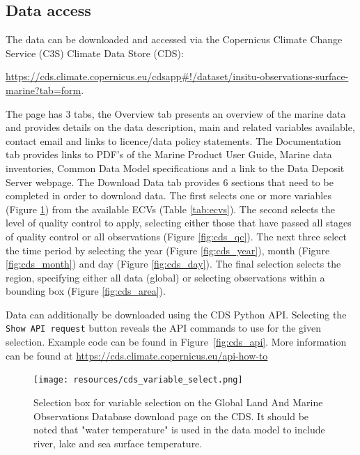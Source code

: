 \subsection{Data access}
The data can be downloaded and accessed via the Copernicus Climate Change Service (C3S) Climate Data Store (CDS):
\begin{center}
\sloppy\url{https://cds.climate.copernicus.eu/cdsapp#!/dataset/insitu-observations-surface-marine?tab=form}.
 \end{center}
The page has 3 tabs, the Overview tab presents an overview of the marine data and provides details on the data description, main and related variables available, contact email and links to licence/data policy statements. 
The Documentation tab provides links to PDF’s of the Marine Product User Guide, Marine data inventories, Common Data Model specifications and a link to the Data Deposit Server webpage. The Download Data tab provides 6 sections that need to be completed in order to download data. The first selects one or more variables (Figure \ref{fig:cds_variable}) from the available ECVs (Table \ref{tab:ecvs}). The second selects the level of quality control to apply, selecting either those that have passed all stages of quality control or all observations (Figure \ref{fig:cds_qc}). The next three select the time period  by selecting the year (Figure \ref{fig:cds_year}), month (Figure \ref{fig:cds_month}) and day (Figure \ref{fig:cds_day}). The final selection selects the region, specifying either all data (global) or selecting observations within a bounding box (Figure \ref{fig:cds_area}).

Data can additionally be downloaded using the CDS Python API. Selecting the \texttt{Show API request} button reveals the API commands to use for the given selection. Example code can be found in Figure~\ref{fig:cds_api}.
More information can be found at \url{https://cds.climate.copernicus.eu/api-how-to}

\FloatBarrier
\begin{figure}[h]
\centering
\texttt{[image: resources/cds\_variable\_select.png]}
\caption{Selection box for variable selection on the Global Land And Marine Observations Database download page on the CDS. It should be noted that "water temperature" is used in the data model to include river, lake and sea surface temperature.\\}
\label{fig:cds_variable}
\end{figure}


